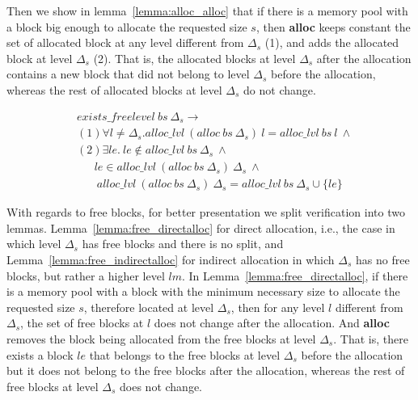 Then we show in lemma~\ref{lemma:alloc_alloc} that if there is a memory pool with a block big enough to allocate the requested size $s$, then \textbf{alloc} keeps constant the set of allocated block at any level different from  $\Delta_s$ (1), and adds the allocated block at level $\Delta_s$ (2). That is, the allocated blocks at level $\Delta_s$ after the allocation contains a new block that did not belong to level $\Delta_s$ before the allocation, whereas the rest of allocated blocks at level $\Delta_s$ do not change.



\begin{lemma} 
\label{lemma:alloc_alloc}
\begin{align*}
&exists\_freelevel\ bs\  \Delta_s \longrightarrow \\
&(1)\forall l \ne \Delta_s. alloc\_lvl\ (alloc\ bs\ \Delta_s)\ l = alloc\_lvl\ bs\ l\ \wedge\\
&(2)\exists le.\ le \notin alloc\_lvl\ bs\ \Delta_s\ \wedge\\
&\ \ \ \ \ \ \ le \in alloc\_lvl\ (alloc\ bs\ \Delta_s)\ \Delta_s\ \wedge\\
&\ \ \ \ \ \ \ \ alloc\_lvl\ (alloc\ bs\ \Delta_s)\ \Delta_s = alloc\_lvl\ bs\ \Delta_s \cup \lbrace le \rbrace
\end{align*}
\end{lemma}

With regards to free blocks, for better presentation we split verification into two lemmas. Lemma~\ref{lemma:free_directalloc} for direct allocation, i.e., the case in which level $\Delta_s$ has free blocks and there is no split, and Lemma~\ref{lemma:free_indirectalloc} for indirect allocation in which $\Delta_s$ has no free blocks, but rather a higher level $lm$. In Lemma~\ref{lemma:free_directalloc}, if there is a memory pool with a block with the minimum necessary size to allocate the requested size $s$, therefore located at level $\Delta_s$, then for any level $l$ different from $\Delta_s$, the set of free blocks at $l$ does not change after the allocation. And \textbf{alloc} removes the block being allocated from the free blocks at level $\Delta_s$. That is, there exists a block $le$ that belongs to the free blocks at level $\Delta_s$ before the allocation but it does not belong to the free blocks after the allocation, whereas the rest of free blocks at level $\Delta_s$ does not change.


